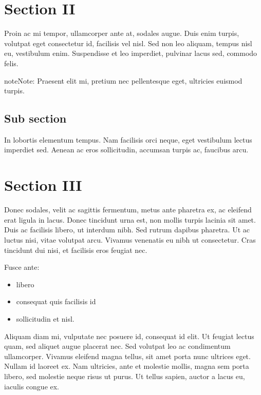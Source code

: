 \documentclass[letterpaper,10pt,english]{sphinxmanual}
\begin{document}
\section{Section II}
\label{\detokenize{specimen:section-ii}}
Proin ac mi tempor, ullamcorper ante at, sodales augue. Duis enim turpis,
volutpat eget consectetur id, facilisis vel nisl. Sed non leo aliquam, tempus
nisl eu, vestibulum enim. Suspendisse et leo imperdiet, pulvinar lacus sed,
commodo felis.

\begin{sphinxadmonition}{note}{Note:}
Praesent elit mi, pretium nec pellentesque eget, ultricies
euismod turpis.
\end{sphinxadmonition}


\subsection{Sub section}
\label{\detokenize{specimen:sub-section}}
In lobortis elementum tempus. Nam facilisis orci neque, eget vestibulum lectus
imperdiet sed. Aenean ac eros sollicitudin, accumsan turpis ac, faucibus arcu.


\section{Section III}
\label{\detokenize{specimen:section-iii}}
Donec sodales, velit ac sagittis fermentum, metus ante pharetra ex, ac eleifend
erat ligula in lacus. Donec tincidunt urna est, non mollis turpis lacinia sit
amet. Duis ac facilisis libero, ut interdum nibh. Sed rutrum dapibus pharetra.
Ut ac luctus nisi, vitae volutpat arcu. Vivamus venenatis eu nibh ut
consectetur. Cras tincidunt dui nisi, et facilisis eros feugiat nec.

Fusce ante:
\begin{itemize}
\item {} 
libero

\item {} 
consequat quis facilisis id

\item {} 
sollicitudin et nisl.

\end{itemize}

Aliquam diam mi, vulputate nec posuere id, consequat id elit. Ut feugiat lectus
quam, sed aliquet augue placerat nec. Sed volutpat leo ac condimentum
ullamcorper. Vivamus eleifend magna tellus, sit amet porta nunc ultrices eget.
Nullam id laoreet ex. Nam ultricies, ante et molestie mollis, magna sem porta
libero, sed molestie neque risus ut purus. Ut tellus sapien, auctor a lacus eu,
iaculis congue ex.
\end{document}
